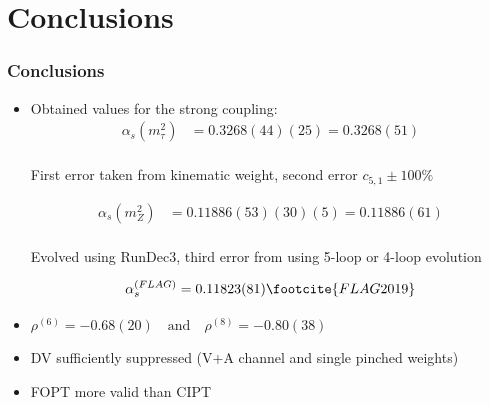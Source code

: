 \documentclass{beamer}
\begin{document}


\section{Conclusions}
\begin{frame}
  \frametitle{Conclusions}
  \begin{itemize}
  \item Obtained values for the strong coupling:
    \begin{equation*}
      \begin{split}
        \alpha_s(m_\tau^2) &= 0.3268(44)(25) = 0.3268(51) \\
      \end{split}
    \end{equation*}
    \begin{small}First error taken from kinematic weight, second error \(c_{5,1} \pm 100\%\)\end{small}
    \begin{equation*}
      \begin{split}
        \alpha_s(m_Z^2) &= 0.11886(53)(30)(5) = 0.11886(61) \\
      \end{split}
    \end{equation*}
    \begin{small}Evolved using RunDec3, third error from using 5-loop or 4-loop evolution\end{small}
    \begin{equation*}
      \alpha_s^{(FLAG)} = 0.11823(81)\footcite{FLAG2019}
    \end{equation*}
  \item \(\rho^{(6)} = -0.68(20) \quad \text{and} \quad \rho^{(8)} = -0.80(38)\)
  \item DV sufficiently suppressed (V+A channel and single pinched weights)
  \item FOPT more valid than CIPT
  \end{itemize}
\end{frame}
\end{document}
